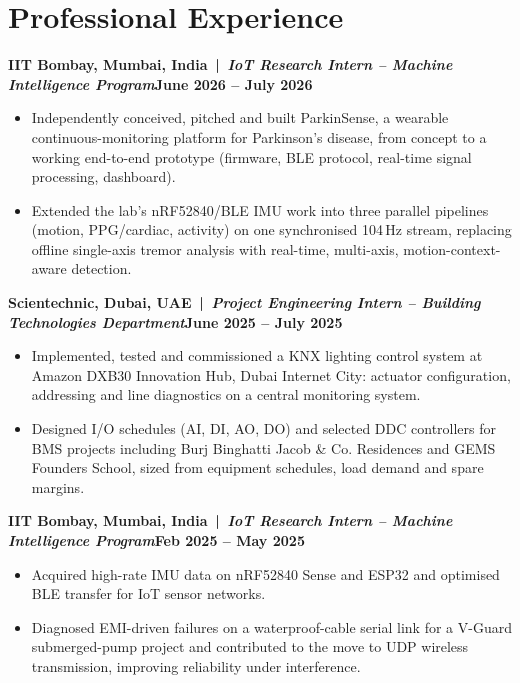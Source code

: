 \documentclass[10pt,letterpaper]{article}
\newcommand{\role}[2]{\par\vspace{2pt}\textbf{#1}\hfill\textbf{#2}\par}
\begin{document}
\section{Professional Experience}
\role{IIT Bombay, Mumbai, India \,|\, \textit{IoT Research Intern -- Machine Intelligence Program}}{June 2026 -- July 2026}
\begin{itemize}
\item Independently conceived, pitched and built ParkinSense, a wearable continuous-monitoring platform for Parkinson's disease, from concept to a working end-to-end prototype (firmware, BLE protocol, real-time signal processing, dashboard).
\item Extended the lab's nRF52840/BLE IMU work into three parallel pipelines (motion, PPG/cardiac, activity) on one synchronised 104\,Hz stream, replacing offline single-axis tremor analysis with real-time, multi-axis, motion-context-aware detection.
\end{itemize}
\role{Scientechnic, Dubai, UAE \,|\, \textit{Project Engineering Intern -- Building Technologies Department}}{June 2025 -- July 2025}
\begin{itemize}
\item Implemented, tested and commissioned a KNX lighting control system at Amazon DXB30 Innovation Hub, Dubai Internet City: actuator configuration, addressing and line diagnostics on a central monitoring system.
\item Designed I/O schedules (AI, DI, AO, DO) and selected DDC controllers for BMS projects including Burj Binghatti Jacob \& Co. Residences and GEMS Founders School, sized from equipment schedules, load demand and spare margins.
\end{itemize}
\role{IIT Bombay, Mumbai, India \,|\, \textit{IoT Research Intern -- Machine Intelligence Program}}{Feb 2025 -- May 2025}
\begin{itemize}
\item Acquired high-rate IMU data on nRF52840 Sense and ESP32 and optimised BLE transfer for IoT sensor networks.
\item Diagnosed EMI-driven failures on a waterproof-cable serial link for a V-Guard submerged-pump project and contributed to the move to UDP wireless transmission, improving reliability under interference.
\end{itemize}
\end{document}
